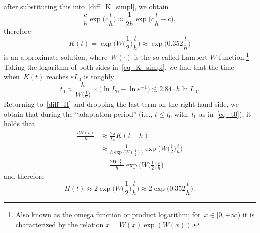 \documentclass[12pt]{article}
\newcommand{\eps}{\varepsilon}
\begin{document}
\begin{CJK}{UTF8}{bkai}
after substituting this into~\eqref{diff_K_simpl},
we obtain
\[
 \frac{c}{h}\exp\Big(c\frac{t}{h}\Big) 
   \approx \frac{1}{2h}\exp\Big(c\frac{t}{h}-c\Big),
\]
therefore 
\begin{equation}
\label{eq_K_simpl}
K(t)=\exp\Big(W\big({\textstyle\frac{1}{2}}\big)\frac{t}{h}\Big)
    \approx \exp\Big(0.352\frac{t}{h}\Big)
\end{equation}
is an approximate solution, where~$W(\cdot)$ is the so-called
Lambert $W$-function.\footnote{Also known as
 the omega function or product logarithm; for~$x\in [0,+\infty)$
it is characterized by the relation $x=W(x)\exp(W(x))$.}
Taking the logarithm of both sides in~\eqref{eq_K_simpl}, we find that
the time when~$K(t)$ reaches $\eps L_0$ is roughly
\begin{equation}
 \label{eq_t0}
 t_0 \approx \frac{h}{W\big({\textstyle\frac{1}{2}}\big)} 
\times \big(\ln L_0 - \ln \eps^{-1}\big)
\lesssim 2.84 \cdot h  \ln L_0.
\end{equation}
Returning to~\eqref{diff_H} and 
dropping the last term on the right-hand side, we
obtain that during the ``adaptation period'' (i.e., $t\leq t_0$
with~$t_0$ as in~\eqref{eq_t0}), it holds that
\begin{align*}
 \frac{d H(t)}{dt} &\approx \frac{2\lambda}
{L_0}K(t-h)
  \\
&\approx \frac{1}{h\exp\big(W(\frac{1}{2})\big)}
\exp\Big(W\big({\textstyle\frac{1}{2}}\big)\frac{t}{h}\Big)
\\
&= \frac{2W\big({\textstyle\frac{1}{2}}\big)}{h}
\exp\Big(W\big({\textstyle\frac{1}{2}}\big)\frac{t}{h}\Big)
\end{align*}
and therefore
\begin{equation}
\label{eq_H}
 H(t)\approx 
2\exp\Big(W\big({\textstyle\frac{1}{2}}\big)\frac{t}{h}\Big)
\approx 2\exp\Big(0.352\frac{t}{h}\Big).
\end{equation}


\end{CJK}
\end{document}
